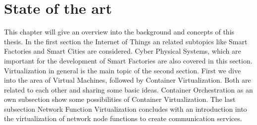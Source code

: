 


\chapter{State of the art}\label{chapter:state-of-the-art}
This chapter will give an overview into the background and concepts of this thesis.
In the first section the Internet of Things an related subtopics like Smart Factories and Smart Cities are considered.
Cyber Physical Systems, which are important for the development of Smart Factories are also covered in this section.
Virtualization in general is the main topic of the second section.
First we dive into the area of Virtual Machines, followed by Container Virtualization.
Both are related to each other and sharing some basic ideas.
Container Orchestration as an own subsection show some possibilities of Container Virtualization.
The last subsection Network Function Virtualization concludes with an introduction into the virtualization of network node functions to create communication services.


